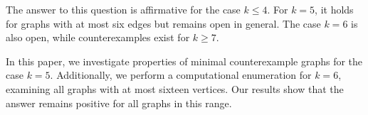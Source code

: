 The answer to this question is affirmative for the case $k \leq 4$. For $k = 5$,
it holds for graphs with at most six edges but remains open in general.
The case $k = 6$ is also open, while counterexamples exist for $k \geq 7$.

In this paper, we investigate properties of minimal counterexample graphs for the case $k = 5$.
Additionally, we perform a computational enumeration for $k = 6$, examining all graphs with at most sixteen vertices.
Our results show that the answer remains positive for all graphs in this range.

